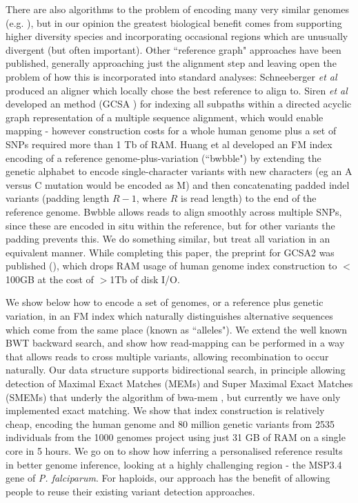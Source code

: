 \documentclass[runningheads,a4paper]{llncs}
\begin{document}
There are also algorithms to the problem of encoding many very similar genomes (e.g. \cite {na}), but in our opinion the greatest biological benefit comes from supporting higher diversity species and incorporating  occasional regions which are  unusually divergent (but often important).
Other ``reference graph" approaches have been published, generally approaching just the alignment step and leaving open the problem of how this is incorporated into standard analyses: Schneeberger \textit{et al} \cite{korbinian} produced an aligner which locally chose the best reference to align to. Siren \textit{et al} developed an  method (GCSA \cite{siren1}) for indexing all subpaths within a directed acyclic graph representation of a multiple sequence alignment, which would enable mapping - however construction costs for a whole human genome plus a set of SNPs required more than 1 Tb of RAM. Huang et al \cite{huang} developed an FM index encoding of a reference genome-plus-variation (``bwbble") by extending the genetic alphabet to encode single-character variants with new characters (eg an A versus C mutation would be encoded as M) and then concatenating padded indel variants (padding length $R-1$, where $R$ is read length) to the end of the reference genome. Bwbble allows reads to align smoothly across multiple SNPs, since these are encoded in situ within the reference, but for other variants the padding prevents this. We do something similar, but treat all variation in an equivalent manner.  While completing this paper, the preprint for GCSA2 was published (\cite{siren2}), which drops RAM usage of human genome index construction to $<$100GB at the cost of $>$1Tb of disk I/O.   

 We show below how to encode a set of genomes, or a reference plus  genetic variation, in an FM index which naturally distinguishes alternative sequences which come from the same place (known as ``alleles"). We extend the well known BWT backward search, and show how read-mapping can be performed in a way that allows reads to cross multiple variants, allowing recombination to occur naturally. Our data structure  supports bidirectional search, in principle allowing detection of Maximal Exact Matches (MEMs) and Super Maximal Exact Matches (SMEMs) that underly the algorithm of bwa-mem \cite{bwa}, but currently we have only implemented exact matching. We show that index construction is relatively cheap, encoding the human genome and 80 million genetic variants from 2535 individuals from the 1000 genomes project using just 31 GB of RAM on a single core in 5 hours. We go on to show how inferring a personalised reference results in better genome inference, looking at a highly challenging region - the MSP3.4 gene of \textit{P. falciparum}. For haploids, our approach has the benefit of allowing people to reuse their existing variant detection approaches. 
\end{document}
